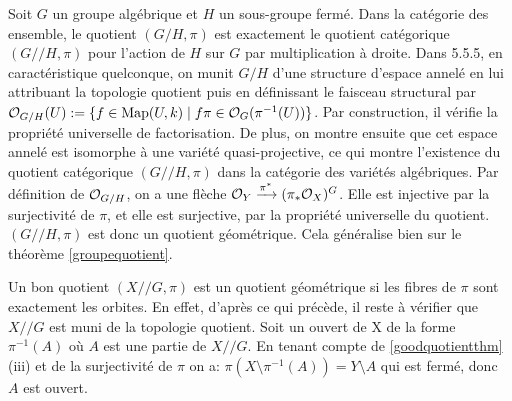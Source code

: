 \begin{ex}
Soit $G$ un groupe algébrique et $H$ un sous-groupe fermé. Dans la catégorie des ensemble, le quotient $(G/H,\pi)$ est exactement le quotient catégorique $(G//H,\pi)$ pour l'action de $H$ sur $G$ par multiplication à droite. Dans \cite{LAGSpringer} 5.5.5, en caractéristique quelconque, on munit $G/H$ d'une structure d'espace annelé en lui attribuant la topologie quotient puis en définissant le faisceau structural par $\mathcal{O}_{G/H}(U):=\lbrace f\in\textrm{Map}(U,k)\mid f\pi \in \mathcal{O}_G(\pi^{-1}(U))\rbrace$. Par construction, il vérifie la propriété universelle de factorisation. De plus, on montre ensuite que cet espace annelé est isomorphe à une variété quasi-projective, ce qui montre l'existence du quotient catégorique $(G//H,\pi)$ dans la catégorie des variétés algébriques. Par définition de $\mathcal{O}_{G/H}$, on a une flèche $\mathcal{O}_Y \xrightarrow{\pi^*} (\pi_*\mathcal{O}_X)^G$. Elle est injective par la surjectivité de $\pi$, et elle est surjective, par la propriété universelle du quotient. $(G//H,\pi)$ est donc un quotient géométrique. Cela généralise bien sur le théorème \ref{groupequotient}.
\end{ex}

\begin{ex}
Un bon quotient $(X//G, \pi)$ est un quotient géométrique si les fibres de $\pi$ sont exactement les orbites. En effet, d'après ce qui précède, il reste à vérifier que $X//G$ est muni de la topologie quotient. Soit un ouvert de X de la forme $\pi^{-1}(A)$ où $A$ est une partie de $X//G$. En tenant compte de \ref{goodquotientthm} (iii) et de la surjectivité de $\pi$ on a: $\pi(X\setminus \pi^{-1}(A))=Y\setminus A$ qui est fermé, donc $A$ est ouvert.
\end{ex}

